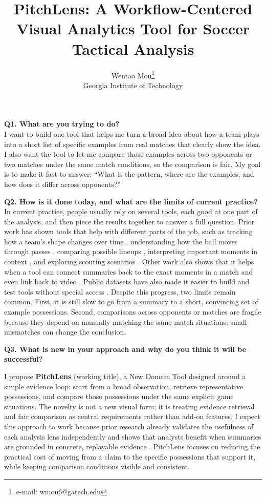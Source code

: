 \documentclass{vgtc}                          %
\title{PitchLens: A Workflow-Centered Visual Analytics Tool for Soccer Tactical Analysis}
\author{Wentao Mou\thanks{e-mail: wmou6@gatech.edu}\\ %
        \scriptsize Georgia Institute of Technology}
\begin{document}
\maketitle

\noindent\textbf{Q1. What are you trying to do?}\\
I want to build one tool that helps me turn a broad idea about how a team plays into a short list of specific examples from real matches that clearly show the idea. I also want the tool to let me compare those examples across two opponents or two matches under the same match conditions, so the comparison is fair. My goal is to make it fast to answer: ``What is the pattern, where are the examples, and how does it differ across opponents?''

\noindent\textbf{Q2. How is it done today, and what are the limits of current practice?}\\
In current practice, people usually rely on several tools, each good at one part of the analysis, and then piece the results together to answer a full question. Prior work has shown tools that help with different parts of the job, such as tracking how a team’s shape changes over time \cite{Wu2019ForVizor}, understanding how the ball moves through passes \cite{Xie2021PassVizor}, comparing possible lineups \cite{Cao2023TeamBuilder}, interpreting important moments in context \cite{Cao2024ActionEvaluator}, and exploring scouting scenarios \cite{Cao2025TeamScouter}. Other work also shows that it helps when a tool can connect summaries back to the exact moments in a match and even link back to video \cite{Stein2018BringItToThePitch}. Public datasets have also made it easier to build and test tools without special access \cite{Pappalardo2019SoccerLogs,Bassek2025BundesligaDataset}. Despite this progress, two limits remain common. First, it is still slow to go from a summary to a short, convincing set of example possessions. Second, comparisons across opponents or matches are fragile because they depend on manually matching the same match situations; small mismatches can change the conclusion.

\noindent\textbf{Q3. What is new in your approach and why do you think it will be successful?}

I propose \textbf{PitchLens} (working title), a New Domain Tool designed around a simple evidence loop: start from a broad observation, retrieve representative possessions, and compare those possessions under the same explicit game situations. The novelty is not a new visual form; it is treating evidence retrieval and fair comparison as central requirements rather than add-on features. I expect this approach to work because prior research already validates the usefulness of each analysis lens independently and shows that analysts benefit when summaries are grounded in concrete, replayable evidence \cite{Wu2019ForVizor,Xie2021PassVizor,Cao2024ActionEvaluator,Stein2018BringItToThePitch}. PitchLens focuses on reducing the practical cost of moving from a claim to the specific possessions that support it, while keeping comparison conditions visible and consistent.
\end{document}
